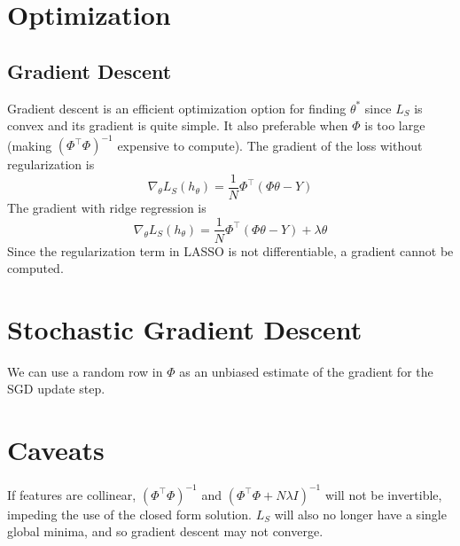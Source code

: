 \documentclass[12pt]{article}
\begin{document}
\section{Optimization}

\subsection{Gradient Descent}

Gradient descent is an efficient optimization option for finding $\theta^*$ since $L_S$ is convex and its gradient is quite simple. It also preferable when $\Phi$ is too large (making $(\Phi^\top\Phi)^{-1}$ expensive to compute). The gradient  of the loss without regularization is
\[ \nabla_\theta L_S(h_\theta) = \frac{1}{N}\Phi^\top(\Phi\theta - Y) \]
The gradient with ridge regression is
\[ \nabla_\theta L_S(h_\theta) = \frac{1}{N}\Phi^\top(\Phi\theta - Y) + \lambda\theta \]
Since the regularization term in LASSO is not differentiable, a gradient cannot be computed.

\section{Stochastic Gradient Descent}

We can use a random row in $\Phi$ as an unbiased estimate of the gradient for the SGD update step.

\section{Caveats}

If features are collinear, $(\Phi^\top \Phi)^{-1}$ and $(\Phi^\top \Phi + N\lambda I)^{-1}$ will not be invertible, impeding the use of the closed form solution. $L_S$ will also no longer have a single global minima, and so gradient descent may not converge.
\end{document}
